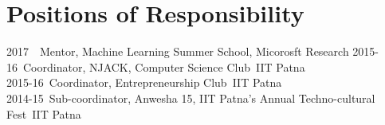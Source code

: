 \section{Positions of Responsibility}
2017~\qquad~Mentor, Machine Learning Summer School, Micorosft Research
2015-16\qquad~Coordinator, NJACK, Computer Science Club\hfill~IIT Patna\\
2015-16\qquad~Coordinator, Entrepreneurship Club\hfill~IIT Patna\\
2014-15\qquad~Sub-coordinator, Anwesha 15, IIT Patna's Annual Techno-cultural Fest\hfill~IIT Patna\\
